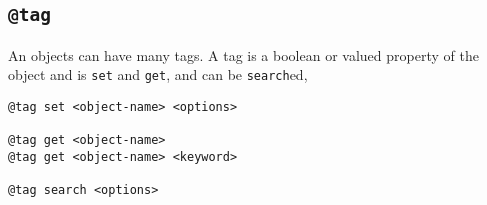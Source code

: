 \subsection{\texttt{@tag}}\label{tag}

An objects can have many tags. A tag is a boolean or valued property of the object and is \texttt{set} and \texttt{get}, and can be \texttt{search}ed,
%
\begin{verbatim}
@tag set <object-name> <options>

@tag get <object-name>
@tag get <object-name> <keyword>

@tag search <options>
\end{verbatim}